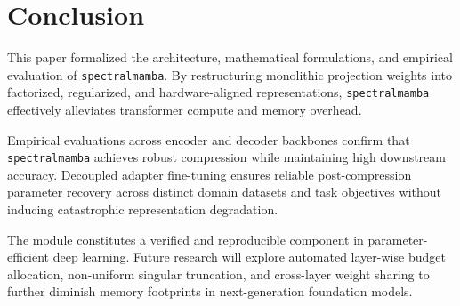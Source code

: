 \section{Conclusion}
This paper formalized the architecture, mathematical formulations, and empirical evaluation of \texttt{spectralmamba}. By restructuring monolithic projection weights into factorized, regularized, and hardware-aligned representations, \texttt{spectralmamba} effectively alleviates transformer compute and memory overhead.

Empirical evaluations across encoder and decoder backbones confirm that \texttt{spectralmamba} achieves robust compression while maintaining high downstream accuracy. Decoupled adapter fine-tuning ensures reliable post-compression parameter recovery across distinct domain datasets and task objectives without inducing catastrophic representation degradation.

The module constitutes a verified and reproducible component in parameter-efficient deep learning. Future research will explore automated layer-wise budget allocation, non-uniform singular truncation, and cross-layer weight sharing to further diminish memory footprints in next-generation foundation models.
